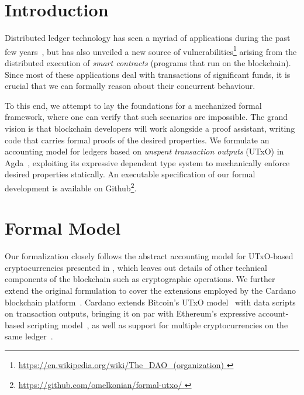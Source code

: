 \documentclass[sigplan,review,screen]{acmart}\settopmatter{printfolios=true,printccs=false,printacmref=false}
\newcommand\site[1]{\footnote{\url{#1}}}
\begin{document}
\maketitle

\section{Introduction}
\label{sec:intro}
Distributed ledger technology has seen a myriad of applications during the past few years~\cite{mpc,zeroproof,fair},
but has also unveiled a new source of vulnerabilities\site{
https://en.wikipedia.org/wiki/The_DAO_(organization)
} arising from the distributed execution of \textit{smart contracts} (programs that run on the blockchain).
Since most of these applications deal with transactions of significant funds, it is crucial
that we can formally reason about their concurrent behaviour.

To this end, we attempt to lay the foundations for a mechanized formal framework,
where one can verify that such scenarios are impossible.
The grand vision is that blockchain developers will work alongside a proof assistant,
writing code that carries formal proofs of the desired properties.
We formulate an accounting model for ledgers based on \textit{unspent transaction outputs} (UTxO) in Agda~\cite{agda},
exploiting its expressive dependent type system to mechanically enforce desired properties statically.
An executable specification of our formal development is available on Github\site{
https://github.com/omelkonian/formal-utxo/
}.

\section{Formal Model}
\label{sec:model}
Our formalization closely follows the abstract accounting model for UTxO-based cryptocurrencies presented in \cite{utxo},
which leaves out details of other technical components of the blockchain such as cryptographic operations.
We further extend the original formulation to cover the extensions employed by the Cardano blockchain platform~\cite{eutxo}.
Cardano extends Bitcoin's UTxO model~\cite{bitcoin} with data scripts on transaction outputs, bringing it on par with Ethereum's expressive account-based scripting model~\cite{ethereum},
as well as support for multiple cryptocurrencies on the same ledger~\cite{multicurrency}.
\end{document}
